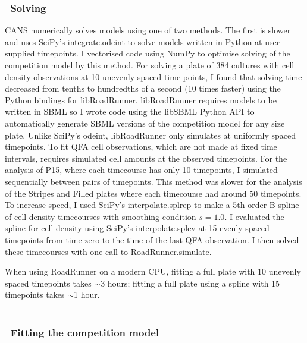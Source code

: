 \subsubsection{\thesubsubsection~Solving}
\label{sec:solving_comp}

CANS numerically solves models using one of two methods. The first is
slower and uses SciPy's integrate.odeint to solve models written in
Python at user supplied timepoints. I vectorised code using NumPy to
optimise solving of the competition model by this method. For solving
a plate of 384 cultures with cell density observations at 10 unevenly
spaced time points, I found that solving time decreased from tenths to
hundredths of a second (10 times faster) using the Python bindings for
libRoadRunner. libRoadRunner requires models to be written in SBML so
I wrote code using the libSBML Python API to automatically generate
SBML versions of the competition model for any size plate.
Unlike SciPy's odeint, libRoadRunner only simulates at uniformly
spaced timepoints. To fit QFA cell observations, which are not made at
fixed time intervals, requires simulated cell amounts at the observed
timepoints. For the analysis of P15, where each timecourse has only 10
timepoints, I simulated sequentially between pairs of timepoints. This
method was slower for the analysis of the Stripes and Filled plates
where each timecourse had around 50 timepoints. To increase speed, I
used SciPy's interpolate.splrep to make a 5th order B-spline of cell
density timecourses with smoothing condition \(s=1.0\). I evaluated
the spline for cell density using SciPy's interpolate.splev at 15
evenly spaced timepoints from time zero to the time of the last QFA
observation. I then solved these timecourses with one call to
RoadRunner.simulate.

When using RoadRunner on a modern CPU, fitting a full plate with 10
unevenly spaced timepoints takes \(\sim\)3 hours; fitting a full
plate using a spline with 15 timepoints takes \(\sim\)1 hour.
\\\\

\subsubsection{\thesubsubsection~Fitting the competition model}
\label{sec:fitting_comp}

